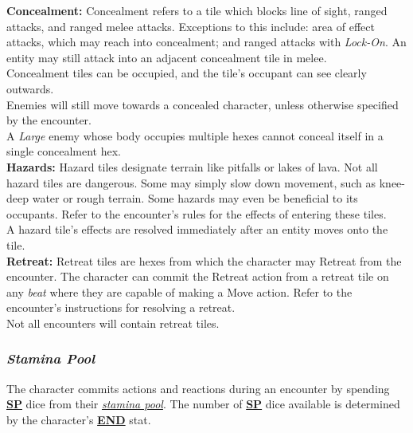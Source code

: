 \documentclass[12pt]{article}
\newcommand{\refto}[1]{\hyperlink{#1}{\textbf{#1}}}
\newcommand{\reftoit}[1]{\hyperlink{#1}{\emph{#1}}}
\begin{document}
\begin{multicols*}{2}
\textbf{Concealment:} Concealment refers to a tile which blocks line of sight, ranged attacks, and ranged melee attacks. Exceptions to this include: area of effect attacks, which may reach into concealment; and ranged attacks with \emph{Lock-On}. An entity may still attack into an adjacent concealment tile in melee.\\
Concealment tiles can be occupied, and the tile’s occupant can see clearly outwards.\\
Enemies will still move towards a concealed character, unless otherwise specified by the encounter.\\
A \emph{Large} enemy whose body occupies multiple hexes cannot conceal itself in a single concealment hex. \\

\textbf{Hazards:} Hazard tiles designate terrain like pitfalls or lakes of lava. Not all hazard tiles are dangerous. Some may simply slow down movement, such as knee-deep water or rough terrain. Some hazards may even be beneficial to its occupants. Refer to the encounter’s rules for the effects of entering these tiles.\\
A hazard tile’s effects are resolved immediately after an entity moves onto the tile.\\

\textbf{Retreat:} Retreat tiles are hexes from which the character may Retreat from the encounter. The character can commit the Retreat action from a retreat tile on any \emph{beat} where they are capable of making a Move action. Refer to the encounter’s instructions for resolving a retreat.\\
Not all encounters will contain retreat tiles.

\subsubsection{\emph{Stamina Pool}}
\hypertarget{stamina pool}{}
The character commits actions and reactions during an encounter by spending \refto{SP} dice from their \reftoit{stamina pool}. The number of \refto{SP} dice available is determined by the character’s \refto{END} stat.


\end{multicols*}
\end{document}
